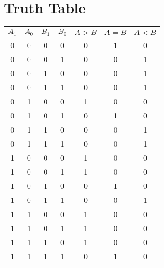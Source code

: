\documentclass{article}
\begin{document}




\section*{Truth Table}
\begin{table}[H]
  \centering
  \begin{tabular}{cc:cc|ccc}
      \toprule
      $A_1$&$A_0$&$B_1$&$B_0$&$A>B$&$A=B$&$A<B$\\
      &0 & 0&0 & 0&1&0\\
      0&0 & 0&1 & 0&0&1\\
      0&0 & 1&0 & 0&0&1\\
      0&0 & 1&1 & 0&0&1\\
      0&1 & 0&0 & 1&0&0\\
      0&1 & 0&1 & 0&1&0\\
      0&1 & 1&0 & 0&0&1\\
      0&1 & 1&1 & 0&0&1\\
      1&0 & 0&0 & 1&0&0\\
      1&0 & 0&1 & 1&0&0\\
      1&0 & 1&0 & 0&1&0\\
      1&0 & 1&1 & 0&0&1\\
      1&1 & 0&0 & 1&0&0\\
      1&1 & 0&1 & 1&0&0\\
      1&1 & 1&0 & 1&0&0\\
      1&1 & 1&1 & 0&1&0\\
      \bottomrule
  \end{tabular}
\end{table}

\newpage
\end{document}
